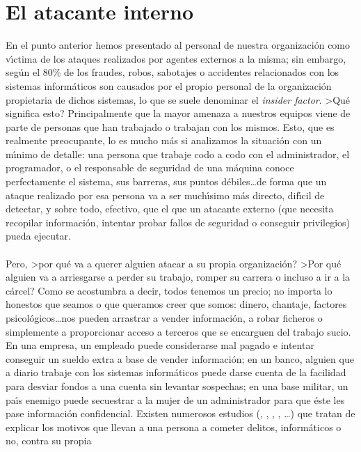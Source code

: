 \section{El atacante interno}
En el punto anterior hemos presentado al personal de nuestra organizaci\'on
como v\'{\i}ctima de los ataques realizados por agentes externos a la misma;
sin embargo, 
seg\'un \cite{kn:cow92} el 80\% de los fraudes, robos, sabotajes o accidentes
relacionados con los sistemas inform\'aticos son causados por el propio personal
de la organizaci\'on propietaria de dichos sistemas, lo que se suele denominar
el {\it insider factor}. >Qu\'e significa esto? 
Principalmente que la mayor amenaza a nuestros equipos viene de parte de
personas que han trabajado o trabajan con los mismos. Esto, que es realmente
preocupante, lo es mucho m\'as si analizamos la situaci\'on con un m\'{\i}nimo
de detalle: una persona que trabaje codo a codo con el administrador, el
programador, o el responsable de seguridad de una m\'aquina conoce perfectamente
el sistema, sus barreras, sus puntos d\'ebiles\ldots de forma que un ataque
realizado por esa persona va a ser much\'{\i}simo m\'as directo, dif\'{\i}cil
de detectar, y sobre todo, efectivo, que el que un atacante externo (que 
necesita recopilar informaci\'on, intentar probar fallos de seguridad o 
conseguir privilegios) pueda ejecutar.\\
\\Pero, >por qu\'e va a querer alguien atacar a su propia organizaci\'on? >Por
qu\'e alguien va a arriesgarse a perder su trabajo, romper su carrera o incluso 
a ir a la
c\'arcel? Como se acostumbra a decir, todos tenemos un precio; no importa lo
honestos que seamos o que queramos creer que somos: dinero, chantaje, factores
psicol\'ogicos\ldots nos pueden arrastrar a vender informaci\'on, a robar
ficheros o simplemente a proporcionar acceso a terceros que se encarguen del
trabajo sucio. En una empresa, un empleado puede considerarse mal pagado e 
intentar conseguir un sueldo extra a base de vender informaci\'on; en un banco,
alguien que a diario trabaje con los sistemas inform\'aticos puede darse
cuenta de la facilidad para desviar fondos a una cuenta sin levantar sospechas;
en una base militar, un pa\'{\i}s enemigo puede secuestrar a la mujer de un
administrador para que \'este les pase informaci\'on confidencial. Existen
numerosos estudios (\cite{kn:syk70}, \cite{kn:cor86}, \cite{kn:hol83}, 
\cite{kn:kat88}, \cite{kn:rei89}\ldots) que tratan de explicar los motivos que 
llevan a una persona a cometer delitos, inform\'aticos o no, contra su propia 
